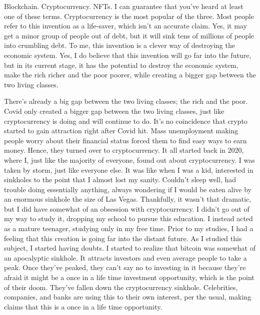 \begin{essay}

  Blockchain. Cryptocurrency. NFTs. I can guarantee that you've heard at
  least one of these terms. Cryptocurrency is the most popular of the three.
  Most people refer to this invention as a life-saver, which isn't an
  accurate claim. Yes, it may get a minor group of people out of debt, but it
  will sink tens of millions of people into crumbling debt. To me, this
  invention is a clever way of destroying the economic system. Yes, I do
  believe that this invention will go far into the future, but in its current
  stage, it has the potential to destroy the economic system, make the rich
  richer and the poor poorer, while creating a bigger gap between the two
  living classes.


  There's already a big gap between the two living classes; the rich and the
  poor. Covid only created a bigger gap between the two living classes, just
  like cryptocurrency is doing and will continue to do. It's no coincidence
  that crypto started to gain attraction right after Covid hit. Mass
  unemployment making people worry about their financial status forced them
  to find easy ways to earn money. Hence, they turned over to cryptocurrency.
  It all started back in $2020$, where I, just like the majority of everyone,
  found out about cryptocurrency. I was taken by storm, just like everyone
  else. It was like when I was a kid, interested in sinkholes to the point
  that I almost lost my sanity. Couldn't sleep well, had trouble doing
  essentially anything, always wondering if I would be eaten alive by an
  enormous sinkhole the size of Las Vegas. Thankfully, it wasn't that
  dramatic, but I did have somewhat of an obsession with cryptocurrency. I
  didn't go out of my way to study it, dropping my school to pursue this
  education. I instead acted as a mature teenager, studying only in my free
  time. Prior to my studies, I had a feeling that this creation is going far
  into the distant future. As I studied this subject, I started having
  doubts. I started to realize that bitcoin was somewhat of an apocalyptic
  sinkhole. It attracts investors and even average people to take a peak.
  Once they've peaked, they can't say no to investing in it because they're
  afraid it might be a once in a life time investment opportunity, which is
  the point of their doom. They've fallen down the cryptocurrency sinkhole.
  Celebrities, companies, and banks are using this to their own interest, per
  the usual, making claims that this is a once in a life time opportunity.


\end{essay}
